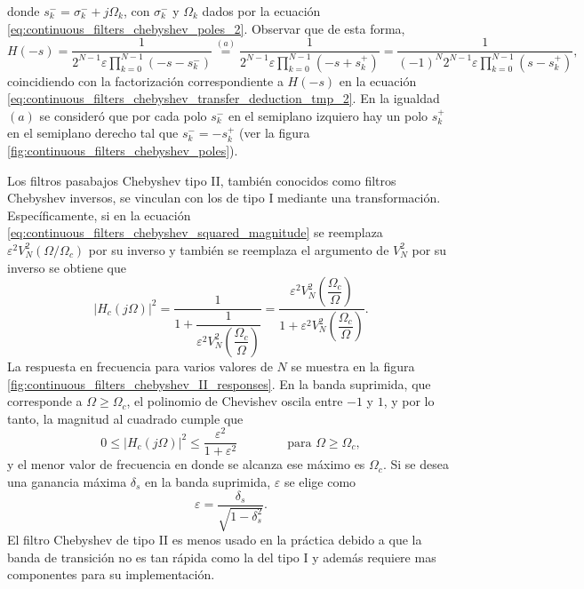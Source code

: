 \documentclass[a4paper]{report}
\begin{document}
donde \(s_k^-=\sigma_k^-+j\Omega_k\), con \(\sigma_k^-\) y \(\Omega_k\) dados por la ecuación \ref{eq:continuous_filters_chebyshev_poles_2}. Observar que de esta forma,
\[
 H(-s)=\frac{1}{\displaystyle 2^{N-1}\varepsilon\prod_{k=0}^{N-1}(-s- s_k^-)}
  \overset{(a)}{=}\frac{1}{\displaystyle 2^{N-1}\varepsilon\prod_{k=0}^{N-1}(-s+s_k^+)}
  =\frac{1}{(-1)^N\displaystyle 2^{N-1}\varepsilon\prod_{k=0}^{N-1}(s-s_k^+)},
\]
coincidiendo con la factorización correspondiente a \(H(-s)\) en la ecuación \ref{eq:continuous_filters_chebyshev_transfer_deduction_tmp_2}. En la igualdad \((a)\) se consideró que por cada polo \(s_k^-\) en el semiplano izquiero hay un polo \(s_k^+\) en el semiplano derecho tal que \(s_k^-=-s_k^+\) (ver la figura \ref{fig:continuous_filters_chebyshev_poles}).

Los filtros pasabajos Chebyshev tipo II, también conocidos como filtros Chebyshev inversos, se vinculan con los de tipo I mediante una transformación. Específicamente, si en la ecuación \ref{eq:continuous_filters_chebyshev_squared_magnitude} se reemplaza \(\varepsilon^2V^2_N(\Omega/\Omega_c)\) por su inverso y también se reemplaza el argumento de \(V_N^2\) por su inverso se obtiene que
\begin{equation}\label{eq:continuous_filters_chebyshev_II_squared_magnitude}
 |H_c(j\Omega)|^2=\dfrac{1}{1+\dfrac{1}{\varepsilon^2V^2_N\left(\dfrac{\Omega_c}{\Omega}\right)}}
   =\dfrac{\varepsilon^2V^2_N\left(\dfrac{\Omega_c}{\Omega}\right)}{1+\varepsilon^2V^2_N\left(\dfrac{\Omega_c}{\Omega}\right)}.
\end{equation}
La respuesta en frecuencia para varios valores de \(N\) se muestra en la figura \ref{fig:continuous_filters_chebyshev_II_responses}. En la banda suprimida, que corresponde a \(\Omega\geq\Omega_c\), el polinomio de Chevishev oscila entre \(-1\) y \(1\), y por lo tanto, la magnitud al cuadrado cumple que 
\[
 0\leq|H_c(j\Omega)|^2\leq\frac{\varepsilon^2}{1+\varepsilon^2}
 \qquad\qquad\textrm{para }\Omega\geq\Omega_c,
\]
y el menor valor de frecuencia en donde se alcanza ese máximo es \(\Omega_c\). Si se desea una ganancia máxima \(\delta_s\) en la banda suprimida, \(\varepsilon\) se elige como
\[
 \varepsilon=\frac{\delta_s}{\sqrt{1-\delta_s^2}}.
\]
El filtro Chebyshev de tipo II es menos usado en la práctica debido a que la banda de transición no es tan rápida como la del tipo I y además requiere mas componentes para su implementación.
\end{document}
